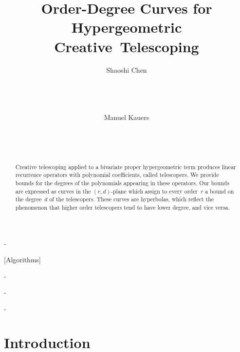 \documentclass{sig-alternate}
\begin{document}
\title{Order-Degree Curves for Hypergeometric Creative~Telescoping}


\author{\alignauthor Shaoshi Chen\\[\smallskipamount]
      \\
      \\
      \\[\smallskipamount]
 \alignauthor \strut Manuel Kauers\\[\smallskipamount]
      \\
      \\
      \\[\smallskipamount]
}

\maketitle
\begin{abstract}
    Creative telescoping applied to a bivariate proper hypergeometric term
    produces linear recurrence operators with polynomial coefficients, called
    telescopers. We provide bounds for the degrees of the polynomials appearing
    in these operators. Our bounds are expressed as curves in the {$(r,d)$-plane}
    which assign to every order~$r$ a bound on the degree~$d$ of the telescopers. 
    These curves are hyperbolas, which reflect the phenomenon that higher order 
    telescopers tend to have lower degree, and vice versa.
\end{abstract}

\kern-\medskipamount

[Algorithms]

\kern-\medskipamount


\kern-\medskipamount


\kern-\medskipamount

\section{Introduction}
\end{document}
